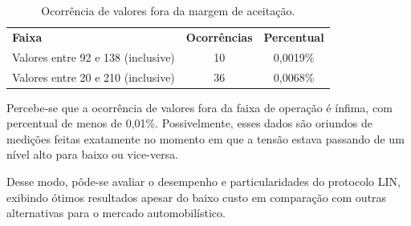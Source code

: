 \begin{table}[htb]
\centering
\caption{Ocorrência de valores fora da margem de aceitação.}
\label{tab:out}
\begin{tabular}{lcc}
\textbf{Faixa}                     & \textbf{Ocorrências} & \textbf{Percentual} \\
Valores entre 92 e 138 (inclusive) & 10                   & 0,0019\%            \\
Valores entre 20 e 210 (inclusive) & 36                   & 0,0068\%           
\end{tabular}
\end{table}

Percebe-se que a ocorrência de valores fora da faixa de operação é ínfima, com percentual de menos de 0,01\%. Possivelmente, esses dados são oriundos de medições feitas exatamente no momento em que a tensão estava passando de um nível alto para baixo ou vice-versa.

Desse modo, pôde-se avaliar o desempenho e particularidades do protocolo LIN, exibindo ótimos resultados apesar do baixo custo em comparação com outras alternativas para o mercado automobilístico.

